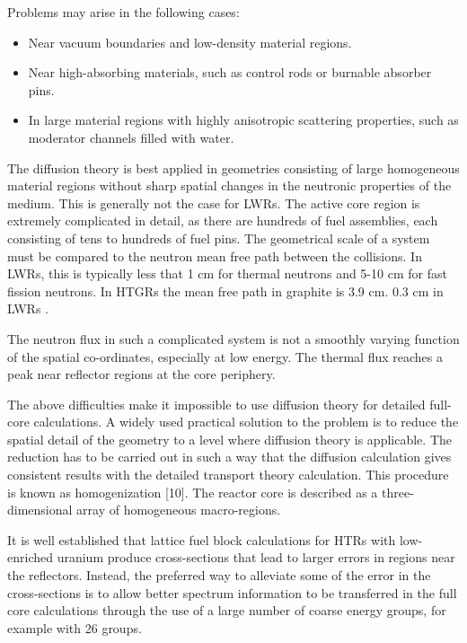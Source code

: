 \documentclass[11pt,letterpaper]{article}
\begin{document}
Problems may arise in the following cases:
\begin{itemize}
	\item Near vacuum boundaries and low-density material regions.
	\item Near high-absorbing materials, such as control rods or burnable absorber pins.
	\item In large material regions with highly anisotropic scattering properties, such as moderator channels filled with water.
\end{itemize}

The diffusion theory is best applied in geometries consisting of large homogeneous material regions without sharp spatial changes in the neutronic properties of the medium.
This is generally not the case for \glspl{LWR}.
The active core region is extremely complicated in detail, as there are hundreds of fuel assemblies, each consisting of tens to hundreds of fuel pins.
The geometrical scale of a system must be compared to the neutron mean free path between the
collisions.
In \glspl{LWR}, this is typically less that 1 cm for thermal neutrons and 5-10 cm for fast fission neutrons.
In \glspl{HTGR} the mean free path in graphite is 3.9 cm. 0.3 cm in \glspl{LWR} \cite{gougar_high_2019}.

The neutron flux in such a complicated system is not a smoothly varying function of the spatial co-ordinates, especially at low energy.
The thermal flux reaches a peak near reflector regions at the core periphery.

The above difficulties make it impossible to use diffusion theory for detailed full-core calculations.
A widely used practical solution to the problem is to reduce the spatial detail of the geometry to a level where diffusion theory is applicable. The reduction has to be carried out in such a way that the diffusion calculation gives consistent results with the detailed transport theory calculation.
This procedure is known as homogenization [10].
The reactor core is described as a three-dimensional array of homogeneous macro-regions.
\cite{leppanen_development_2007}


It is well established that lattice fuel block calculations for HTRs with low-enriched uranium produce cross-sections that lead to larger errors in regions near the reflectors.
Instead, the preferred way to alleviate some of the error in the cross-sections is to allow better spectrum information to be transferred in the full core calculations through the use of a large number of coarse energy groups, for example with 26 groups.
\cite{oecd_nea_coupled_2020}
\end{document}
